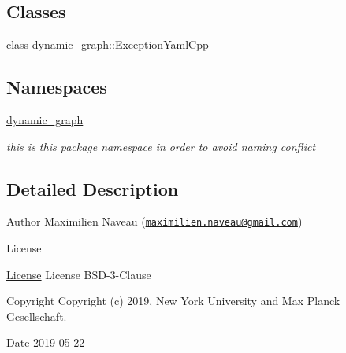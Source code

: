 \subsection*{Classes}
\begin{DoxyCompactItemize}
\item 
class \hyperlink{classdynamic__graph_1_1ExceptionYamlCpp}{dynamic\+\_\+graph\+::\+Exception\+Yaml\+Cpp}
\end{DoxyCompactItemize}
\subsection*{Namespaces}
\begin{DoxyCompactItemize}
\item 
 \hyperlink{namespacedynamic__graph}{dynamic\+\_\+graph}
\begin{DoxyCompactList}\small\item\em this is this package namespace in order to avoid naming conflict \end{DoxyCompactList}\end{DoxyCompactItemize}


\subsection{Detailed Description}
\begin{DoxyAuthor}{Author}
Maximilien Naveau (\href{mailto:maximilien.naveau@gmail.com}{\tt maximilien.\+naveau@gmail.\+com}) 
\end{DoxyAuthor}
\begin{DoxyRefDesc}{License}
\item[\hyperlink{license__license000013}{License}]License B\+S\+D-\/3-\/\+Clause \end{DoxyRefDesc}
\begin{DoxyCopyright}{Copyright}
Copyright (c) 2019, New York University and Max Planck Gesellschaft. 
\end{DoxyCopyright}
\begin{DoxyDate}{Date}
2019-\/05-\/22 
\end{DoxyDate}
